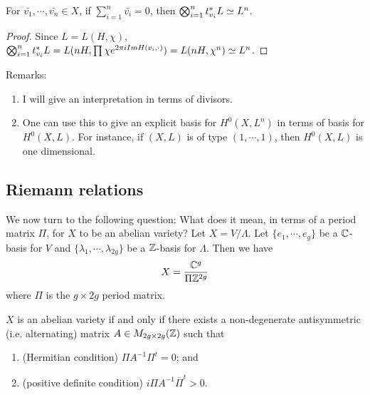 \begin{lemma}
For $\bar{v_1},\cdots,\bar{v_n}\in X$, if $\sum_{i=1}^n \bar{v_i}=0$, then $\bigotimes_{i=1}^n t^*_{v_i} L\simeq L^n$.
\end{lemma}
\begin{proof}
Since $L=L(H,\chi)$, $\bigotimes_{i=1}^n t^*_{v_i} L
=L(nH,\prod \chi e^{2\pi i Im H(v_i,\cdot)})=L(nH,\chi^n)
\simeq L^n$.
\end{proof}

Remarks:
\begin{enumerate}
\item I will give an interpretation in terms of divisors.
\item One can use this to give an explicit basis for $H^0(X,L^n)$ in terms of basis for $H^0(X,L)$. For instance, if $(X,L)$ is of type $(1,\cdots,1)$, then $H^0(X,L)$ is one dimensional.
\end{enumerate}

\subsection{Riemann relations}

We now turn to the following question: What does it mean, in terms of a period matrix $\Pi$, for $X$ to be an abelian variety?
Let $X=V/\Lambda$. Let $\{e_1,\cdots , e_g\}$ be a ${\mathbb C}$-basis for $V$ and $\{\lambda_1,\cdots, \lambda_{2g}\}$ be a ${\mathbb Z}$-basis for $\Lambda$. Then we have 
$$X=\frac{{\mathbb C}^g}{\Pi {\mathbb Z}^{2g}}$$
where $\Pi$ is the $g\times 2g$ period matrix. 

\begin{theorem}
$X$ is an abelian variety if and only if there exists a non-degenerate antisymmetric (i.e. alternating) matrix $A\in M_{2g\times 2g}({\mathbb Z})$ such that 
\begin{enumerate}
\item (Hermitian condition) $\Pi A^{-1} \Pi^t=0$; and
\item (positive definite condition) $i\Pi A^{-1}\overline{\Pi}^t>0$.
\end{enumerate}
\end{theorem}

